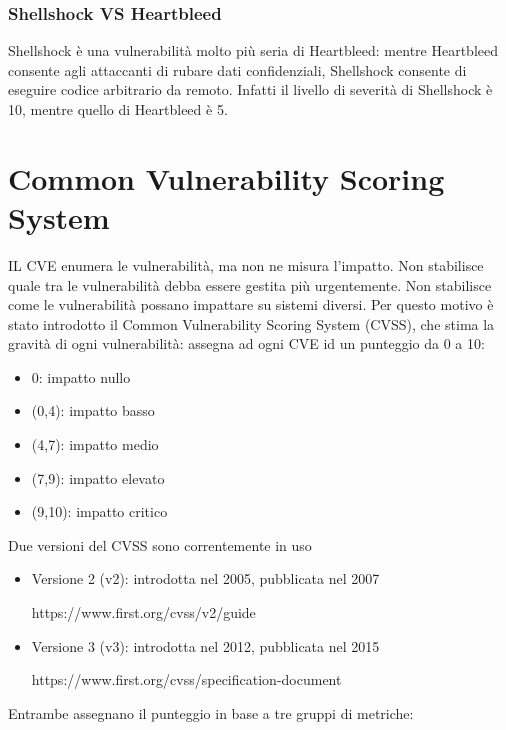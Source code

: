 \subsubsection{Shellshock VS Heartbleed}
Shellshock è una vulnerabilità molto più
seria di Heartbleed: mentre Heartbleed consente agli
attaccanti di rubare dati confidenziali, Shellshock consente di eseguire codice
arbitrario da remoto. Infatti il livello di severità di Shellshock è 10, mentre quello di Heartbleed è 5.

\section{Common Vulnerability Scoring System}
IL CVE enumera le vulnerabilità, ma non ne misura
l’impatto. Non stabilisce quale tra le vulnerabilità debba essere
gestita più urgentemente. Non stabilisce come le vulnerabilità possano impattare
su sistemi diversi. Per questo motivo è stato introdotto il
Common Vulnerability Scoring System (CVSS), che stima la gravità di ogni vulnerabilità: assegna ad ogni CVE id un punteggio da 0 a 10:
\begin{itemize}
    \item 0: impatto nullo
    \item (0,4): impatto basso
    \item (4,7): impatto medio
    \item (7,9): impatto elevato
    \item (9,10): impatto critico 
\end{itemize}
Due versioni del CVSS sono correntemente in uso
\begin{itemize}
    \item Versione 2 (v2): introdotta nel 2005, pubblicata nel 2007
    
https://www.first.org/cvss/v2/guide
    \item Versione 3 (v3): introdotta nel 2012, pubblicata nel 2015
    
    https://www.first.org/cvss/specification-document
\end{itemize}
Entrambe assegnano il punteggio in base a tre gruppi
di metriche:
